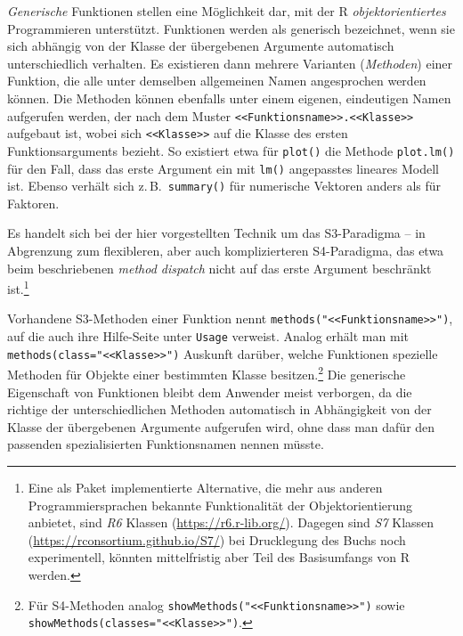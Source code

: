 \emph{Generische} Funktionen stellen eine Möglichkeit dar, mit der R \emph{objektorientiertes} Programmieren unterstützt. Funktionen werden als generisch bezeichnet, wenn sie sich abhängig von der Klasse der übergebenen Argumente automatisch unterschiedlich verhalten. Es existieren dann mehrere Varianten (\emph{Methoden}) einer Funktion, die alle unter demselben allgemeinen Namen angesprochen werden können. Die Methoden können ebenfalls unter einem eigenen, eindeutigen Namen aufgerufen werden, der nach dem Muster \lstinline!<<Funktionsname>>.<<Klasse>>! aufgebaut ist, wobei sich \lstinline!<<Klasse>>! auf die Klasse des ersten Funktionsarguments bezieht. So existiert etwa für \lstinline!plot()! die Methode \lstinline!plot.lm()! für den Fall, dass das erste Argument ein mit \lstinline!lm()! angepasstes lineares Modell ist. Ebenso verhält sich z.\,B.\ \lstinline!summary()! für numerische Vektoren anders als für Faktoren.

Es handelt sich bei der hier vorgestellten Technik um das S3-Paradigma -- in Abgrenzung zum flexibleren, aber auch komplizierteren S4-Paradigma, das etwa beim beschriebenen \emph{method dispatch} nicht auf das erste Argument beschränkt ist.\footnote{Eine als Paket implementierte Alternative, die mehr aus anderen Programmiersprachen bekannte Funktionalität der Objektorientierung anbietet, sind \emph{R6} Klassen (\url{https://r6.r-lib.org/}). Dagegen sind \emph{S7} Klassen (\url{https://rconsortium.github.io/S7/}) bei Drucklegung des Buchs noch experimentell, könnten mittelfristig aber Teil des Basisumfangs von R werden.}

Vorhandene S3-Methoden einer Funktion nennt \lstinline!methods("<<Funktionsname>>")!, auf die auch ihre Hilfe-Seite unter \lstinline!Usage! verweist. Analog erhält man mit \lstinline!methods(class="<<Klasse>>")! Auskunft darüber, welche Funktionen spezielle Methoden für Objekte einer bestimmten Klasse besitzen.\footnote{Für S4-Methoden analog \lstinline!showMethods("<<Funktionsname>>")! sowie \lstinline!showMethods(classes="<<Klasse>>")!.} Die generische Eigenschaft von Funktionen bleibt dem Anwender meist verborgen, da die richtige der unterschiedlichen Methoden automatisch in Abhängigkeit von der Klasse der übergebenen Argumente aufgerufen wird, ohne dass man dafür den passenden spezialisierten Funktionsnamen nennen müsste.

